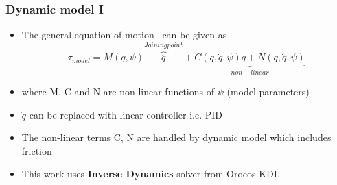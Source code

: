 \documentclass{beamer}
\begin{document}
\begin{frame}
	\frametitle{Dynamic model I}
	\begin{itemize}
		\item The general equation of motion~\cite{p2} can be given as
\begin{equation}
\label{eq:dynamics}
\tau_{model} = M(q, \psi) \overbrace{\ddot{q}}^{Joining point} + \underbrace{C(q, \dot{q}, \psi)\dot{q} + N(q,\dot{q}, \psi)}_{non-linear}
\end{equation}
		\item where M, C and N are non-linear functions of $\psi$ (model parameters)
		\item $\ddot{q}$ can be replaced with linear controller i.e. PID~\cite{p12}
		\item The non-linear terms C, N are handled by dynamic model which includes friction
		\item This work uses \textbf{Inverse Dynamics }solver from Orocos KDL~\cite{p4}
	\end{itemize}
\end{frame}
\end{document}
